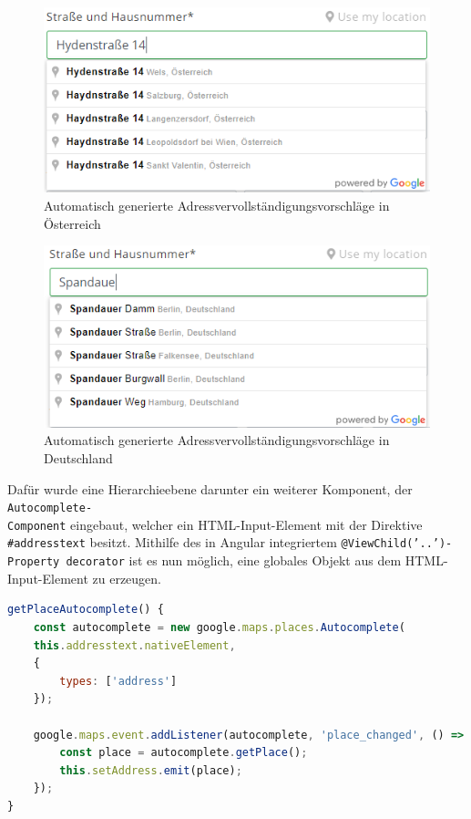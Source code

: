 \begin{figure}[H]
	\centerline{
		\includegraphics[width=1\textwidth, frame]{./grafiken/open_adress_completion.PNG}
	}
	\vskip0pt
	\caption{Automatisch generierte Adressvervollständigungsvorschläge in Österreich}
\end{figure}

\begin{figure}[H]
	\centerline{
		\includegraphics[width=1\textwidth, frame]{./grafiken/open_adress_completion_de.PNG}
	}
	\vskip0pt
	\caption{Automatisch generierte Adressvervollständigungsvorschläge in Deutschland}
\end{figure}

Dafür wurde eine Hierarchieebene darunter ein weiterer Komponent, der \texttt{Autocomplete-\\Component} eingebaut, welcher ein HTML-Input-Element mit der Direktive \texttt{\#address\-text} besitzt. Mithilfe des in Angular integriertem \texttt{@ViewChild('..')-Property de\-corator} ist es nun möglich, eine globales Objekt aus dem HTML-Input-Element zu erzeugen. 

\begin{lstlisting}[caption={Die \texttt{getPlaceAutocomplete()}-Methode der \texttt{AutocompleteComponent}-Klasse}, language=JavaScript,label={lst:gpac}]
getPlaceAutocomplete() {
	const autocomplete = new google.maps.places.Autocomplete(
	this.addresstext.nativeElement,
	{
		types: ['address']
	});
	
	google.maps.event.addListener(autocomplete, 'place_changed', () => {
		const place = autocomplete.getPlace();
		this.setAddress.emit(place);
	});
}
\end{lstlisting}

